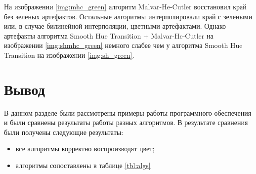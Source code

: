 \clearpage
{}
\clearpage

На изображении \ref{img:mhc_green} алгоритм Malvar-He-Cutler восстановил край без зеленых артефактов. Остальные алгоритмы интерполировали край с зелеными или, в случае билинейной интерполяции, цветными артефактами. Однако артефакты алгоритма Smooth Hue Transition + Malvar-He-Cutler на изображении \ref{img:shmhc_green} немного слабее чем у алгоритма Smooth Hue Transition на изображении \ref{img:sh_green}.

\section*{Вывод}

В данном разделе были рассмотрены примеры работы программного обеспечения и были сравнены результаты работы разных алгоритмов. В результате сравнения были получены следующие результаты:
\begin{itemize}
	\item все алгоритмы корректно воспроизводят цвет;
	\item алгоритмы сопоставлены в таблице \ref{tbl:algs}
\end{itemize}

\begin{table}[h]
	\begin{center}
		\caption{Сравнение алгоритмов.}
		\label{tbl:algs}
	\end{center}
\end{table}


